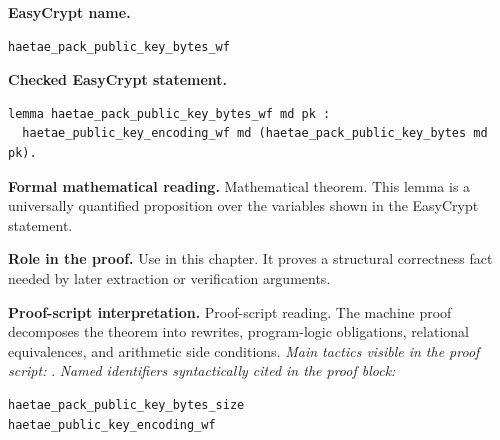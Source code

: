 \begin{formaltheorem}
\noindent\textbf{EasyCrypt name.}
\begin{lstlisting}[language=EasyCrypt,basicstyle=\ttfamily\scriptsize]
haetae_pack_public_key_bytes_wf
\end{lstlisting}
\noindent\textbf{Checked EasyCrypt statement.}
\begin{lstlisting}[language=EasyCrypt,basicstyle=\ttfamily\scriptsize]
lemma haetae_pack_public_key_bytes_wf md pk :
  haetae_public_key_encoding_wf md (haetae_pack_public_key_bytes md pk).
\end{lstlisting}
\noindent\textbf{Formal mathematical reading.}
Mathematical theorem. This lemma is a universally quantified proposition over the variables shown in the EasyCrypt statement.

\noindent\textbf{Role in the proof.}
Use in this chapter. It proves a structural correctness fact needed by later extraction or verification arguments.

\noindent\textbf{Proof-script interpretation.}
Proof-script reading. The machine proof decomposes the theorem into rewrites, program-logic obligations, relational equivalences, and arithmetic side conditions.
\emph{Main tactics visible in the proof script:} .
\emph{Named identifiers syntactically cited in the proof block:}
\begin{lstlisting}[language=EasyCrypt,basicstyle=\ttfamily\scriptsize]
haetae_pack_public_key_bytes_size
haetae_public_key_encoding_wf
\end{lstlisting}

\end{formaltheorem}

